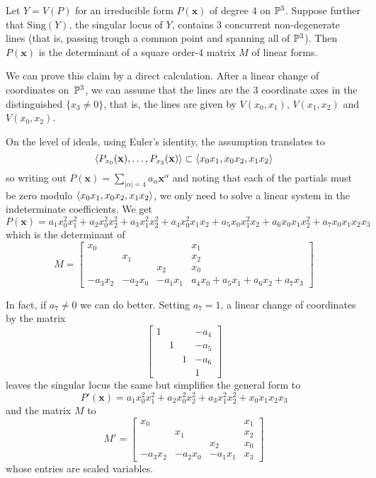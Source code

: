 \documentclass[fleqn,reqno]{amsart}
\numberwithin{first}{chapter}
\begin{document}
\begin{example}[$\mt{ex312}$]
\label{ex312}
Let $Y=V(P)$ for an irreducible form $P(\mathbf x)$ of degree $4$ on $\mathbb{P}^3$.
Suppose further that $\text{Sing}(Y)$, the singular locus of $Y$,
contains 3 concurrent non-degenerate lines
(that is, passing trough a common point and spanning all of $\mathbb{P}^3$).
Then $P(\mathbf x)$ is the determinant of a square order-$4$ matrix $M$ of linear forms.

We can prove this claim by a direct calculation.
After a linear change of coordinates on~$\mathbb{P}^3$,
we can assume that the lines are the 3 coordinate axes in the distinguished $\{x_3\neq0\}$,
that is, the lines are given by $V(x_0,x_1)$, $V(x_1,x_2)$ and $V(x_0,x_2)$.

On the level of ideals, using Euler's identity, the assumption translates to
\[
	\langle P_{x_0}(\mathbf x),\ldots, P_{x_3}(\mathbf x) \rangle\subset\langle x_0x_1,x_0x_2,x_1x_2\rangle
\]
so writing out $P(\mathbf x)=\sum_{|\alpha|=4} a_\alpha {\mathbf x}^\alpha$
and noting that each of the partials must be zero modulo $\langle x_0x_1,x_0x_2,x_1x_2\rangle$,
we only need to solve a linear system in the indeterminate coefficients.
We get
\[
	P(\mathbf x)=
	a_1x_0^2x_1^2+a_2x_0^2x_2^2+a_3x_1^2x_2^2+a_4x_0^2x_1x_2+a_5x_0x_1^2x_2+a_6x_0x_1x_2^2+a_7x_0x_1x_2x_3
\]
which is the determinant of
\[
	M=\begin{bmatrix}
	x_0&&&x_1\\
	&x_1&&x_2\\
	&&x_2&x_0\\
	-a_3x_2&-a_2x_0&-a_1x_1& a_4x_0+a_5x_1+a_6x_2+a_7x_3
	\end{bmatrix}
\]

In fact, if $a_7\neq0$ we can do better.
Setting $a_7=1$, a linear change of coordinates by the matrix
\[
\begin{bmatrix}
1&&&-a_4\\
&1&&-a_5\\
&&1&-a_6\\
&&&1
\end{bmatrix}
\]
leaves the singular locus the same but simplifies the general form to
\[
P'(\mathbf x)=a_1x_0^2x_1^2+a_2x_0^2x_2^2+a_3x_1^2x_2^2+x_0x_1x_2x_3
\]
and the matrix $M$ to
\[
M'=\begin{bmatrix}
x_0&&&x_1\\
&x_1&&x_2\\
&&x_2&x_0\\
-a_3x_2&-a_2x_0&-a_1x_1&x_3
\end{bmatrix}
\]
whose entries are scaled variables.
\end{example}
\end{document}
